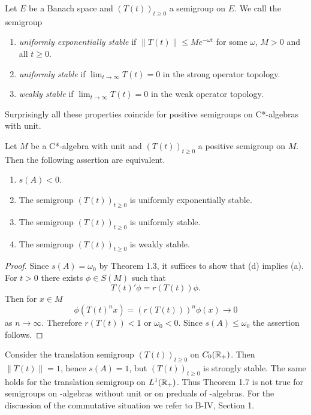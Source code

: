 \begin{definition}\label{def:d4-1.6}
Let $E$ be a Banach space and $(T(t))_{t \geq 0}$ a semigroup on $E$.
We call the semigroup
\begin{enumerate}[\upshape (i)]
\item 
\emph{uniformly exponentially stable} if $\|T(t)\| \leq Me^{-\omega t}$ for some $\omega$, $M > 0$ and all $t \geq 0$.

\item 
\emph{uniformly stable} if $\lim_{t \to \infty} T(t) = 0$ in the strong operator topology.

\item 
\emph{weakly stable} if $\lim_{t \to \infty} T(t) = 0$ in the weak operator topology.
\end{enumerate}
\end{definition}
Surprisingly all these properties coincide for positive semigroups on C*-algebras with unit.
\begin{theorem}\label{thm:d4-1.7}
Let $M$ be a C*-algebra with unit and $(T(t))_{t \geq 0}$ a positive semigroup on $M$.
Then the following assertion are equivalent.

\begin{enumerate}[\upshape (a)]
\item 
$s(A) < 0$.

\item 
The semigroup $(T(t))_{t \geq 0}$ is uniformly exponentially stable.

\item 
The semigroup $(T(t))_{t \geq 0}$ is uniformly stable.

\item 
The semigroup $(T(t))_{t \geq 0}$ is weakly stable.

\end{enumerate}
\end{theorem}
\begin{proof}
Since $s(A) = \omega_{0}$ by Theorem 1.3, it suffices to show that (d) implies (a).
For $t > 0$ there exists $\phi \in S(M)$ such that
\[
    T(t)'\phi = r(T(t))\phi .
\]
Then for $x \in M$
\[
    \phi(T(t)^{n}x) = (r(T(t)))^{n} \phi(x) \to 0
\]
as $n \to \infty$.
Therefore $r(T(t)) < 1$ or $\omega_{0} < 0$.
Since $s(A) \leq \omega_{0}$ the assertion follows.
\end{proof}
\begin{remark}\label{rem:d4-1.8}
Consider the translation semigroup $(T(t))_{t \geq 0}$ on $C_{0}(\mathbb{R}_{+})$. 
Then $\|T(t)\| = 1$, hence $s(A) = 1$, but $(T(t))_{t \geq 0}$ is strongly stable.
The same holds for the translation semigroup on $L^1(\mathbb{R}_{+})$.
Thus Theorem 1.7 is not true for semigroups on \CA-algebras without unit or on preduals of \WA-algebras.
For the discussion of the commutative situation we refer to B-IV, Section 1.
\end{remark}
